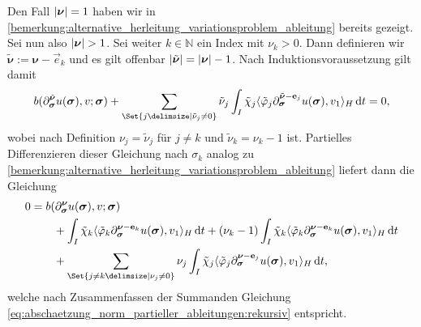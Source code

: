 \documentclass[../main.tex]{subfiles}
\begin{document}
\begin{Satz}
\begin{Beweis}
        Den Fall $\lvert\bm\nu\rvert = 1$ haben wir in \cref{bemerkung:alternative_herleitung_variationsproblem_ableitung} bereits gezeigt.
        Sei nun also $\lvert\bm\nu\rvert > 1$.
        Sei weiter $k \in \mathbb{N}$ ein Index mit $\nu_{k} > 0$.
        Dann definieren wir $\tilde{\bm\nu} := \bm\nu - \vec e_{k}$ und es gilt offenbar $\lvert\tilde{\bm\nu}\rvert = \lvert\bm\nu\rvert - 1$.
        Nach Induktionsvoraussetzung gilt damit
        \begin{equation}
            b(\partial^{\tilde{\bm\nu}}_{\bm\sigma} u(\bm\sigma), v; \bm\sigma) + \sum_{\Set{j \given \tilde{\nu}_{j} \neq 0}} \tilde{\nu}_{j} \int_{I} \tilde{\chi}_{j} \skp{\tilde{\varphi}_{j} \partial^{\tilde{\bm\nu} - \vec e_{j}}_{\bm\sigma} u(\bm\sigma)}{v_{1}}{H} \diff t = 0,
        \end{equation}
        wobei nach Definition $\nu_{j} = \tilde{\nu}_{j}$ für $j \neq k$ und $\tilde{\nu}_{k} = \nu_{k} - 1$ ist.
        Partielles Differenzieren dieser Gleichung nach $\sigma_{k}$ analog zu \cref{bemerkung:alternative_herleitung_variationsproblem_ableitung} liefert dann die Gleichung
        \begin{align}
            0 &=
                b(\partial^{\bm\nu}_{\bm\sigma} u(\bm\sigma), v; \bm\sigma)
           \\&\qquad          + \int_{I} \tilde{\chi}_{k} \skp{\tilde{\varphi}_{k} \partial^{\bm\nu - \vec e_{k}}_{\bm\sigma} u(\bm\sigma)}{v_{1}}{H} \diff t
                + (\nu_{k} - 1) \int_{I} \tilde{\chi}_{k} \skp{\tilde{\varphi}_{k} \partial^{\bm\nu - \vec e_{k}}_{\bm\sigma} u(\bm\sigma) }{v_{1}}{H} \diff t
           \\&\qquad     + \sum_{\Set{j \neq k \given \nu_{j} \neq 0}} \nu_{j} \int_{I} \tilde{\chi}_{j} \skp{\tilde{\varphi}_{j} \partial^{\bm\nu - \vec e_{j}}_{\bm\sigma} u(\bm\sigma)}{v_{1}}{H} \diff t,
        \end{align}
        welche nach Zusammenfassen der Summanden Gleichung \cref{eq:abschaetzung_norm_partieller_ableitungen:rekursiv} entspricht.


\end{Beweis}
\end{Satz}
\end{document}

